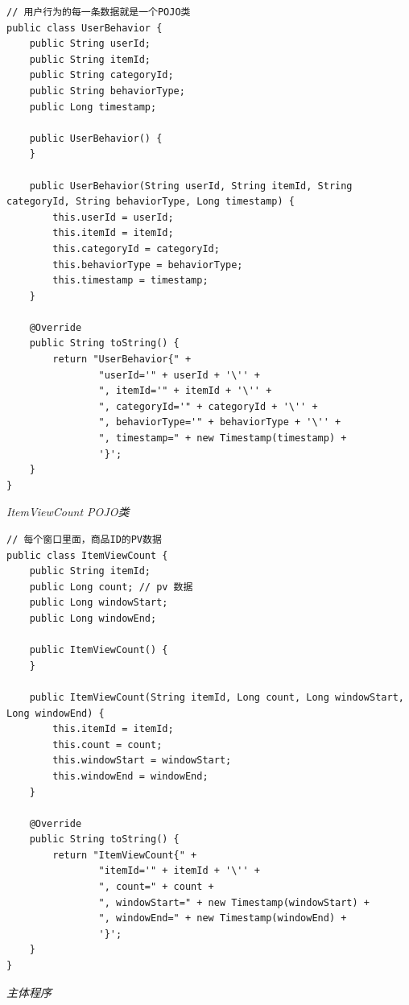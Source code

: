 \documentclass[cn,11pt,chinese]{elegantbook}
\begin{document}
\begin{verbatim}
// 用户行为的每一条数据就是一个POJO类
public class UserBehavior {
    public String userId;
    public String itemId;
    public String categoryId;
    public String behaviorType;
    public Long timestamp;

    public UserBehavior() {
    }

    public UserBehavior(String userId, String itemId, String categoryId, String behaviorType, Long timestamp) {
        this.userId = userId;
        this.itemId = itemId;
        this.categoryId = categoryId;
        this.behaviorType = behaviorType;
        this.timestamp = timestamp;
    }

    @Override
    public String toString() {
        return "UserBehavior{" +
                "userId='" + userId + '\'' +
                ", itemId='" + itemId + '\'' +
                ", categoryId='" + categoryId + '\'' +
                ", behaviorType='" + behaviorType + '\'' +
                ", timestamp=" + new Timestamp(timestamp) +
                '}';
    }
}
\end{verbatim}

\textit{ItemViewCount POJO类}

\begin{verbatim}
// 每个窗口里面，商品ID的PV数据
public class ItemViewCount {
    public String itemId;
    public Long count; // pv 数据
    public Long windowStart;
    public Long windowEnd;

    public ItemViewCount() {
    }

    public ItemViewCount(String itemId, Long count, Long windowStart, Long windowEnd) {
        this.itemId = itemId;
        this.count = count;
        this.windowStart = windowStart;
        this.windowEnd = windowEnd;
    }

    @Override
    public String toString() {
        return "ItemViewCount{" +
                "itemId='" + itemId + '\'' +
                ", count=" + count +
                ", windowStart=" + new Timestamp(windowStart) +
                ", windowEnd=" + new Timestamp(windowEnd) +
                '}';
    }
}
\end{verbatim}

\textit{主体程序}
\end{document}
